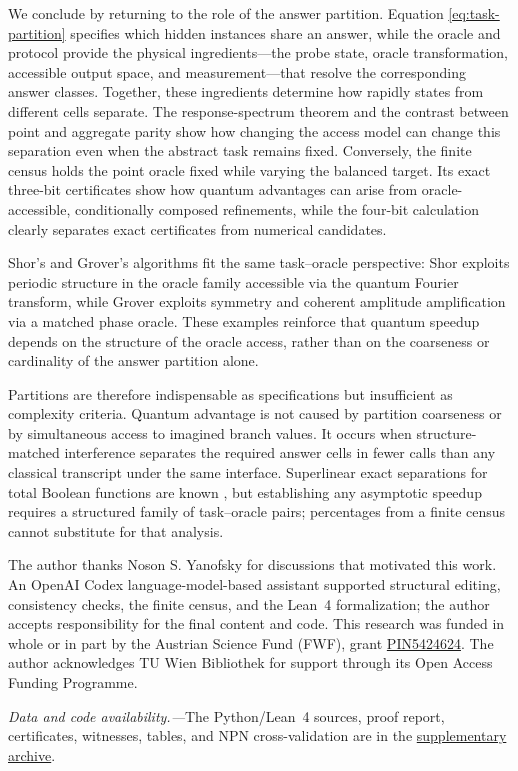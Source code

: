 \documentclass[
  aps,
  prl,
  reprint,
  nofootinbib
]{revtex4-2}
\begin{document}
We conclude by returning to the role of the answer partition. Equation
\eqref{eq:task-partition} specifies which hidden instances share an answer,
while the oracle and protocol provide the physical ingredients---the probe
state, oracle transformation, accessible output space, and measurement---that
resolve the corresponding answer classes. Together, these ingredients
determine how rapidly states from different cells separate. The
response-spectrum theorem and the contrast between point and aggregate parity
show how changing the access model can change this separation even when the
abstract task remains fixed. Conversely, the finite census holds the point
oracle fixed while varying the balanced target. Its exact three-bit
certificates show how quantum advantages can arise from oracle-accessible,
conditionally composed refinements, while the four-bit calculation clearly
separates exact certificates from numerical candidates.

Shor's and Grover's algorithms fit the same task--oracle perspective: Shor
exploits periodic structure in the oracle family accessible via the quantum Fourier transform,
while Grover exploits symmetry and coherent amplitude amplification via a matched phase oracle.
These examples reinforce that
quantum speedup depends on the structure of the oracle access, rather than on
the coarseness or cardinality of the answer partition alone.

Partitions are therefore indispensable as specifications but insufficient as
complexity criteria. Quantum advantage is not caused by partition coarseness
or by simultaneous access to imagined branch values. It occurs when
structure-matched interference separates the required answer cells in fewer
calls than any classical transcript under the same interface. Superlinear
exact separations for total Boolean functions are known
\cite{Ambainis2016SuperlinearExact}, but establishing any asymptotic speedup
requires a structured family of task--oracle pairs; percentages from a finite
census cannot substitute for that analysis.

\begin{acknowledgments}
The author thanks Noson S. Yanofsky for discussions that motivated this
work. An OpenAI Codex language-model-based assistant supported structural
editing, consistency checks, the finite census, and the Lean~4 formalization;
the author accepts responsibility for the final content and code. This research
was funded in whole or in part by the Austrian Science Fund (FWF), grant
\href{https://doi.org/10.55776/PIN5424624}{PIN5424624}. The author
acknowledges TU Wien Bibliothek for support through its Open Access Funding
Programme.
\end{acknowledgments}

\noindent\textit{Data and code availability.---}The Python/Lean~4 sources,
proof report, certificates, witnesses, tables, and NPN cross-validation are in the
\href{https://svozil.github.io/publications/2026-qc-partition-census-supplement.zip}{supplementary archive}.


\end{document}
